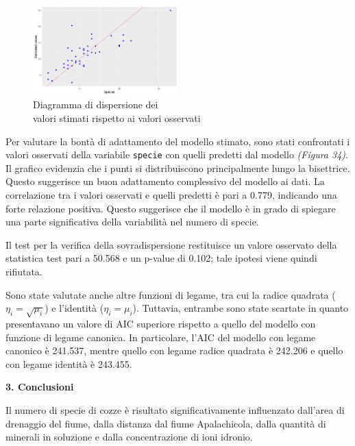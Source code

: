 \documentclass{article} %
\begin{document}
\begin{figure}[H]
    \centering
    \includegraphics[width=0.5\textwidth]{immagini/res_val_oss_glm.png}
    \captionsetup{justification=centering}
    \caption{Diagramma di dispersione dei \\valori stimati rispetto ai valori osservati}
\end{figure}

Per valutare la bontà di adattamento del modello stimato, sono stati confrontati i valori osservati della variabile \texttt{specie} con quelli predetti dal modello \textit{(Figura 34)}. Il grafico evidenzia che i punti si distribuiscono principalmente lungo la bisettrice. Questo suggerisce un buon adattamento complessivo del modello ai dati. La correlazione tra i valori osservati e quelli predetti è pari a 0.779, indicando una forte relazione positiva. Questo suggerisce che il modello è in grado di spiegare una parte significativa della variabilità nel numero di specie.

Il test per la verifica della sovradispersione restituisce un valore osservato della statistica test pari a 50.568 e un p-value di 0.102; tale ipotesi viene quindi rifiutata.  

Sono state valutate anche altre funzioni di legame, tra cui la radice quadrata ($\eta_i=\sqrt{\mu_i}$) e l'identità ($\eta_i=\mu_i$). Tuttavia, entrambe sono state scartate in quanto presentavano un valore di AIC superiore rispetto a quello del modello con funzione di legame canonica. In particolare, l'AIC del modello con legame canonico è 241.537, mentre quello con legame radice quadrata è 242.206 e quello con legame identità è 243.455.

\vskip 70pt
\begin{flushleft}
    \textbf{\Huge 3. \: Conclusioni}
\end{flushleft}
\vskip 10pt

Il numero di specie di cozze è risultato significativamente influenzato dall'area di drenaggio del fiume, dalla distanza dal fiume Apalachicola, dalla quantità di minerali in soluzione e dalla concentrazione di ioni idronio.
\end{document}
